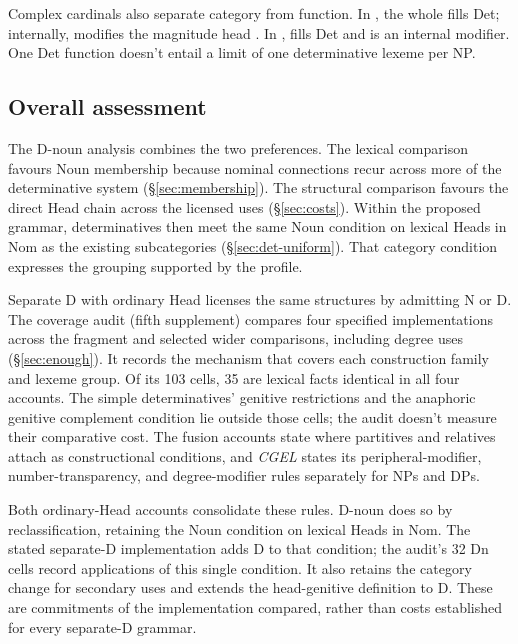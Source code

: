 \documentclass[12pt]{article}
\begin{document}
Complex cardinals also separate category from function. In , the whole  fills Det; internally,  modifies the magnitude head  \citep[§4]{reynolds2026numerals}. In ,  fills Det and  is an internal modifier. One Det function doesn't entail a limit of one determinative lexeme per NP.

\subsection{Overall assessment}\label{sec:overall-assessment}

The D-noun analysis combines the two preferences. The lexical comparison favours Noun membership because nominal connections recur across more of the determinative system (§\ref{sec:membership}). The structural comparison favours the direct Head chain across the licensed uses (§\ref{sec:costs}). Within the proposed grammar, determinatives then meet the same Noun condition on lexical Heads in Nom as the existing subcategories (§\ref{sec:det-uniform}). That category condition expresses the grouping supported by the profile.

Separate D with ordinary Head licenses the same structures by admitting N or D. The coverage audit (fifth supplement) compares four specified implementations across the fragment and selected wider comparisons, including degree uses (§\ref{sec:enough}). It records the mechanism that covers each construction family and lexeme group. Of its 103 cells, 35 are lexical facts identical in all four accounts. The simple determinatives' genitive restrictions and the anaphoric genitive complement condition lie outside those cells; the audit doesn't measure their comparative cost. The fusion accounts state where partitives and relatives attach as constructional conditions, and \textit{CGEL} states its peripheral-modifier, number-transparency, and degree-modifier rules separately for NPs and DPs.

Both ordinary-Head accounts consolidate these rules. D-noun does so by reclassification, retaining the Noun condition on lexical Heads in Nom. The stated separate-D implementation adds D to that condition; the audit's 32 Dn cells record applications of this single condition. It also retains the category change for secondary uses and extends the head-genitive definition to D. These are commitments of the implementation compared, rather than costs established for every separate-D grammar.
\end{document}
